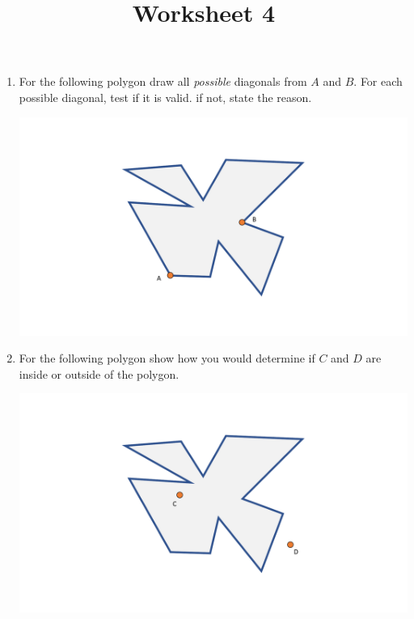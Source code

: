 \documentclass[a4paper,12pt]{article}
\title{Worksheet 4}
\begin{document}
\maketitle

\worksheetGroundRules

\worksheetSubmission

\assignmentInstructions

\begin{enumerate}


\item For the following polygon draw all \textit{possible} diagonals from $A$ and $B$. For each possible diagonal, test if it is valid. if not, state the reason. 

\vspace{20pt}
\begin{center}
\includegraphics[width=0.8\linewidth]{../images/diagonals.pdf}
\end{center}


\newpage

\item For the following polygon show how you would determine if $C$ and $D$ are inside or outside of the polygon.

\vspace{20pt}
\begin{center}
\includegraphics[width=0.7\linewidth]{../images/point_in_poly.pdf}
\end{center}


\end{enumerate}
\end{document}
